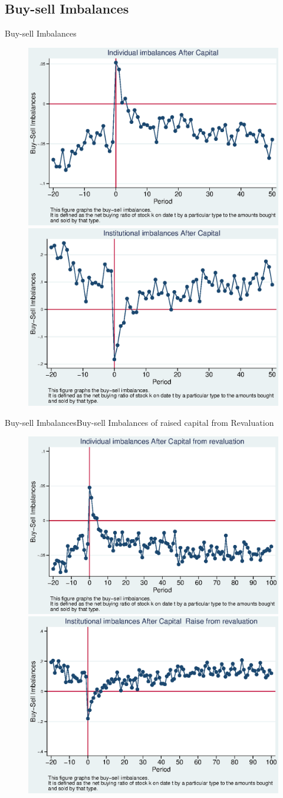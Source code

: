 \documentclass{beamer}
\begin{document}
\subsection{Buy-sell Imbalances}

\begin{frame}{Buy-sell Imbalances}
\begin{figure}
\centering
\includegraphics[width=0.45\linewidth]{Output/IndImb.eps}
\includegraphics[width=0.45\linewidth]{Output/InsImb.eps}
\label{fig:indimb}
\end{figure}
\end{frame}
\begin{frame}{Buy-sell Imbalances}{Buy-sell Imbalances of raised capital from Revaluation}
\begin{figure}
\centering
\includegraphics[width=0.45\linewidth]{Output/IndImb_Revaluation.eps}
\includegraphics[width=0.45\linewidth]{Output/InsImb_Revaluation.eps}
\label{fig:indimbrevaluation}
\end{figure}
\end{frame}
\end{document}
